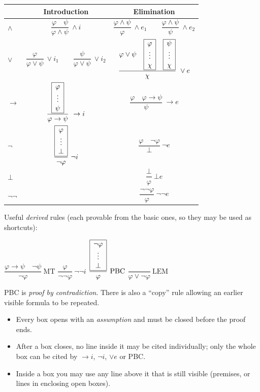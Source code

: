 \newcommand{\ndbox}[2]{\begin{array}{|c|}\hline #1\\ \vdots\\ #2\\\hline\end{array}}
\renewcommand{\arraystretch}{1.25}
\begin{center}
\begin{tabular}{lcc}
\toprule
 & Introduction & Elimination\\
\midrule
$\land$ &
  $\dfrac{\varphi\quad\psi}{\varphi\land\psi}\ \land i$ &
  $\dfrac{\varphi\land\psi}{\varphi}\ \land e_1\qquad\dfrac{\varphi\land\psi}{\psi}\ \land e_2$\\[3ex]
$\lor$ &
  $\dfrac{\varphi}{\varphi\lor\psi}\ \lor i_1\qquad\dfrac{\psi}{\varphi\lor\psi}\ \lor i_2$ &
  $\dfrac{\varphi\lor\psi\quad\ndbox{\varphi}{\chi}\quad\ndbox{\psi}{\chi}}{\chi}\ \lor e$\\[6ex]
$\to$ &
  $\dfrac{\ndbox{\varphi}{\psi}}{\varphi\to\psi}\ \to i$ &
  $\dfrac{\varphi\quad\varphi\to\psi}{\psi}\ \to e$\\[6ex]
$\neg$ &
  $\dfrac{\ndbox{\varphi}{\bot}}{\neg\varphi}\ \neg i$ &
  $\dfrac{\varphi\quad\neg\varphi}{\bot}\ \neg e$\\[6ex]
$\bot$ & & $\dfrac{\bot}{\varphi}\ \bot e$\\[3ex]
$\neg\neg$ & & $\dfrac{\neg\neg\varphi}{\varphi}\ \neg\neg e$\\
\bottomrule
\end{tabular}
\end{center}
\renewcommand{\arraystretch}{1}

Useful \emph{derived} rules (each provable from the basic ones, so they may be used as
shortcuts):
\begin{center}
$\dfrac{\varphi\to\psi\quad\neg\psi}{\neg\varphi}\ \text{MT}$\qquad
$\dfrac{\varphi}{\neg\neg\varphi}\ \neg\neg i$\qquad
$\dfrac{\ndbox{\neg\varphi}{\bot}}{\varphi}\ \text{PBC}$\qquad
$\dfrac{}{\varphi\lor\neg\varphi}\ \text{LEM}$
\end{center}
PBC is \emph{proof by contradiction}. There is also a ``copy'' rule allowing an earlier
visible formula to be repeated.

\begin{important}
\begin{itemize}
  \item Every box opens with an \emph{assumption} and must be closed before the proof
        ends.
  \item After a box closes, no line inside it may be cited individually; only the whole
        box can be cited by $\to i$, $\neg i$, $\lor e$ or PBC.
  \item Inside a box you may use any line above it that is still visible (premises, or
        lines in enclosing open boxes).
\end{itemize}
\end{important}

